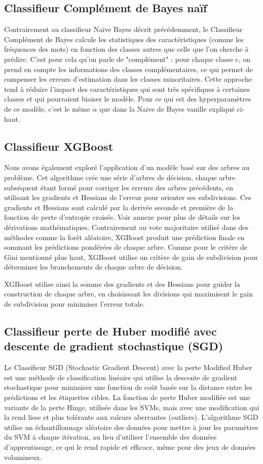 \documentclass{article}
\begin{document}
\subsection{Classifieur Complément de Bayes naïf}
Contrairement au classifieur Naïve Bayes décrit précédemment, le Classifieur Complément de Bayes calcule les statistiques des caractéristiques (comme les fréquences des mots) en fonction des classes autres que celle que l’on cherche à prédire. C'est pour cela qu'on parle de "complément" : pour chaque classe c, on prend en compte les informations des classes complémentaires, ce qui permet de compenser les erreurs d’estimation dans les classes minoritaires. Cette approche tend à réduire l’impact des caractéristiques qui sont très spécifiques à certaines classes et qui pourraient biaiser le modèle. Pour ce qui est des hyperparamètres de ce modèle, c'est le même $\alpha$ que dans la Naive de Bayes vanille expliqué ci-haut.
\subsection{Classifieur XGBoost}
Nous avons également exploré l’application d’un modèle basé sur des arbres au problème. Cet algorithme crée une série d'arbres de décision, chaque arbre subséquent étant formé pour corriger les erreurs des arbres précédents, en utilisant les gradients et Hessians de l’erreur pour orienter ses subdivisions. Ces gradients et Hessians sont calculé par la derivée seconde et première de la fonction de perte d'entropie croisée. Voir annexe pour plus de détails sur les dérivations mathématiques. Contrairement au vote majoritaire utilisé dans des méthodes comme la forêt aléatoire, XGBoost produit une prédiction finale en sommant les prédictions pondérées de chaque arbre. Comme pour le critère de Gini mentionné plus haut, XGBoost utilise un critère de gain de subdivision pour déterminer les branchements de chaque arbre de décision. 

XGBoost utilise ainsi la somme des gradients et des Hessians pour guider la construction de chaque arbre, en choisissant les divisions qui maximisent le gain de subdivision pour minimiser l’erreur totale.  

\subsection{Classifieur perte de Huber modifié avec descente de gradient stochastique (SGD)}
Le Classifieur SGD (Stochastic Gradient Descent) avec la perte Modified Huber est une méthode de classification linéaire qui utilise la descente de gradient stochastique pour minimiser une fonction de coût basée sur la distance entre les prédictions et les étiquettes cibles. La fonction de perte Huber modifiée est une variante de la perte Hinge, utilisée dans les SVMs, mais avec une modification qui la rend lisse et plus tolérante aux valeurs aberrantes (outliers). L'algorithme SGD utilise un échantillonnage aléatoire des données pour mettre à jour les paramètres du SVM à chaque itération, au lieu d'utiliser l’ensemble des données d'apprentissage, ce qui le rend rapide et efficace, même pour des jeux de données volumineux.
\end{document}
